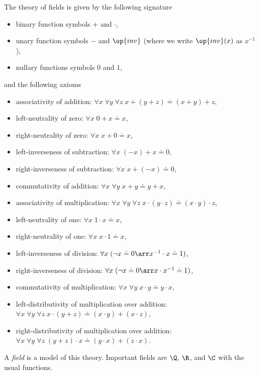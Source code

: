 \begin{example}[Fields]\label{ex:field}
The theory of fields is given by the following signature
\begin{itemize}
\item binary function symbols $+$ and $\cdot$,
\item unary function symbols $-$ and $\op{inv}$ (where we write $\op{inv}(x)$ as $x^{-1}$),
\item nullary functions symbols $0$ and $1$,
\end{itemize}
and the following axioms
\begin{itemize}
\item associativity of addition: $\forall x\;\forall y\;\forall z\;x+ (y+ z) \doteq (x+ y)+ z$,
\item left-neutrality of zero: $\forall x\;0+ x \doteq x$,
\item right-neutrality of zero: $\forall x\;x+ 0 \doteq x$,
\item left-inverseness of subtraction: $\forall x\;(-x)+ x \doteq 0$,
\item right-inverseness of subtraction: $\forall x\;x+ (-x) \doteq 0$,
\item commutativity of addition: $\forall x\;\forall y\;x+y \doteq y+ x$,
\item associativity of multiplication: $\forall x\;\forall y\;\forall z\;x\cdot (y\cdot  z) \doteq (x\cdot y)\cdot  z$,
\item left-neutrality of one: $\forall x\;1\cdot x \doteq x$,
\item right-neutrality of one: $\forall x\;x\cdot 1 \doteq x$,
\item left-inverseness of division: $\forall x\;(\neg x\doteq 0\arr x^{-1}\cdot x \doteq 1)$,
\item right-inverseness of division: $\forall x\;(\neg x\doteq 0\arr x\cdot x^{-1} \doteq 1)$,
\item commutativity of multiplication: $\forall x\;\forall y\;x\cdot y \doteq y\cdot x$,
\item left-distributivity of multiplication over addition: $\forall x\;\forall y\;\forall z\;x\cdot (y+ z) \doteq (x\cdot y)+ (x\cdot z)$,
\item right-distributivity of multiplication over addition: $\forall x\;\forall y\;\forall z\;(y+ z)\cdot x \doteq (y\cdot x)+ (z\cdot x)$.
\end{itemize}
A \emph{field} is a model of this theory.
Important fields are $\Q$, $\R$, and $\C$ with the usual functions.


\end{example}
